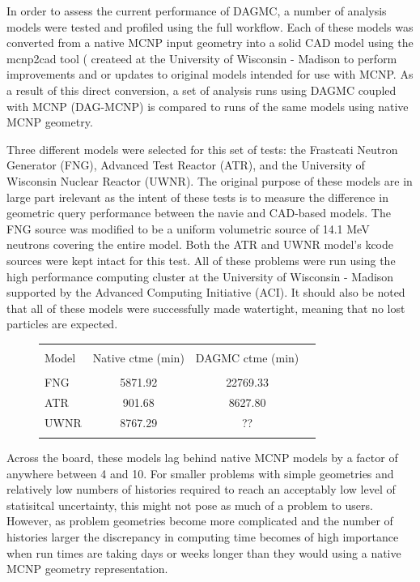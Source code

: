 \documentclass[10pt, a4paper]{article}
\begin{document}
In order to assess the current performance of DAGMC, a number of analysis models were tested and profiled using the full workflow. Each of these models was converted from a native MCNP input geometry into a solid CAD model using the mcnp2cad tool ( createed at the University of Wisconsin - Madison to perform improvements and or updates to original models intended for use with MCNP. As a result of this direct conversion, a set of analysis runs using DAGMC coupled with MCNP (DAG-MCNP) is compared to runs of the same models using native MCNP geometry.

Three different models were selected for this set of tests: the Frastcati Neutron Generator (FNG), Advanced Test Reactor (ATR), and the University of Wisconsin Nuclear Reactor (UWNR). The original purpose of these models are in large part irelevant as the intent of these tests is to measure the difference in geometric query performance between the navie and CAD-based models. The FNG source was modified to be a uniform volumetric source of 14.1 MeV neutrons covering the entire model. Both the ATR and UWNR model's kcode sources were kept intact for this test. All of these problems were run using the high performance computing cluster at the University of Wisconsin - Madison supported by the Advanced Computing Initiative (ACI). It should also be noted that all of these models were successfully made watertight, meaning that no lost particles are expected.

\begin{figure}[H]
  \centering
  \begin{tabular}{l c c c}
    \toprule \\
    Model & Native ctme (min) & DAGMC ctme (min) \\
    \hline \\
    FNG &  5871.92 & 22769.33 \\
    ATR &  901.68 & 8627.80 \\
    UWNR &  8767.29 & ?? \\
    \hline \\
  \end{tabular}
\end{figure}

Across the board, these models lag behind native MCNP models by a factor of anywhere between 4 and 10. For smaller problems with simple geometries and relatively low numbers of histories required to reach an acceptably low level of statisitcal uncertainty, this might not pose as much of a problem to users. However, as problem geometries become more complicated and the number of histories larger the discrepancy in computing time becomes of high importance when run times are taking days or weeks longer than they would using a native MCNP geometry representation.
\end{document}

